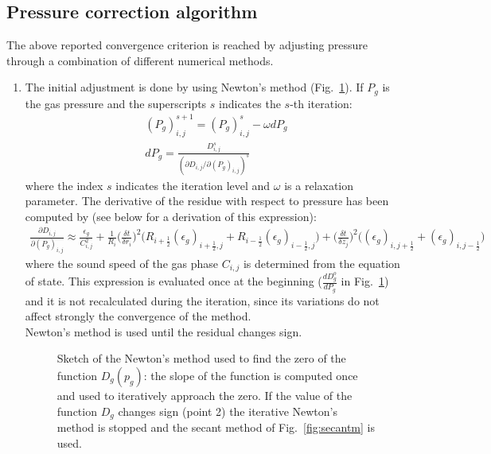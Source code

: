 \subsection{\label{sect:pressure} Pressure correction algorithm}
%
The above reported convergence criterion is reached by adjusting 
pressure through a combination of different numerical methods.
\begin{enumerate}
\item
The initial adjustment is done by using Newton's method (Fig.~\ref{fig:newtonm}). 
If $P_g$ is the gas pressure and the superscripts $s$ indicates the $s$-th iteration:
%
\begin{eqnarray}
(P_g)_{i,j}^{s+1} =  (P_g)_{i,j}^{s} - \omega dP_g  \label{eq:correction}\\
dP_g = \frac {D_{i,j}^s} {\left(\partial D_{i,j} / \partial (P_g)_{i,j}\right)^s}\label{eq:dDdP}
\end{eqnarray}
%
where the index $s$ indicates the iteration level and $\omega$ is a relaxation parameter.
The derivative of the residue with respect to pressure has been computed by (see below for
a derivation of this expression):
%
\begin{eqnarray}
\frac{\partial D_{i,j}} {\partial (P_g)_{i,j}} \approx 
\frac{\epsilon_g}{C_{i,j}^{2}} +
\frac{1}{R_i}\Big(\frac {\delta t} {\delta r_i}\Big)^2 \big( 
R_{i+\frac{1}{2}} (\epsilon_g)_{i+\frac{1}{2},j} +
R_{i-\frac{1}{2}} (\epsilon_g)_{i-\frac{1}{2},j} \big)+
\Big(\frac {\delta t} {\delta z_j}\Big)^2 \big( 
(\epsilon_g)_{i,j+\frac{1}{2}} + (\epsilon_g)_{i,j-\frac{1}{2}} \big)
\nonumber
\end{eqnarray}
%
where the sound speed of the gas phase $C_{i,j}$ is determined from the equation of state. This expression
is evaluated once at the beginning ($\frac{dD_g^o}{dP_g}$ in Fig.~\ref{fig:newtonm}) 
and it is not recalculated during the iteration, since its variations do not affect strongly 
the convergence of the method.\\
Newton's method is used until the residual changes sign.
\begin{figure}[h]
\centerline{}
\caption{\label{fig:newtonm} Sketch of the Newton's method used to find the zero of the function
$D_g(p_g)$: the slope of the function is computed once and used to iteratively approach the zero.
If the value of the function $D_g$ changes sign (point 2) the iterative Newton's method is
stopped and the secant method of Fig.~\ref{fig:secantm} is used.}
\end{figure}

\end{enumerate}
